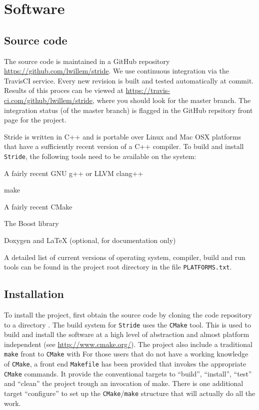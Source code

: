 \chapter{Software}
\label{chap:software}


\section{Source code}
\label{section:source}
The source code is maintained in a GitHub repository \url{https://github.com/lwillem/stride}. We use continuous integration via the TravisCI service. Every new revision is built and tested automatically at commit. Results of this proces can be viewed at \url{https://travis-ci.com/github/lwillem/stride}, where you should look for the master branch. The integration status (of the master branch) is flagged in the GitHub repsitory front page for the project. 

Stride is written in C++ and is portable over Linux and Mac OSX platforms that have a sufficiently recent version of a C++ compiler. To build and install \texttt{Stride}, the following tools need to be available on the system:
\begin{compactitem}
    \item A fairly recent GNU g++ or LLVM clang++
    \item make
    \item A fairly recent CMake
    \item The Boost library
    \item Doxygen  and LaTeX (optional, for documentation only)
\end{compactitem}
A detailed list of current versions of operating system, compiler, build and run tools can be found in the project root directory in the file \texttt{PLATFORMS.txt}.

\section{Installation}
\label{section:Installation}

To install the project, first obtain the source code by cloning the code repository to a directory .
The build system for \texttt{Stride} uses the \texttt{CMake} tool. This is used to build and install the software at a high level of abstraction and almost platform independent (see \url{http://www.cmake.org/}).
The project also include a traditional \texttt{make} front to \texttt{CMake}  with 
For those users that do not have a working knowledge of \texttt{CMake}, a front end \texttt{Makefile} has been provided that invokes the appropriate \texttt{CMake} commands. It provide the conventional targets to ``build'', ``install'', ``test'' and ``clean'' the project trough an invocation of make. There is one additional target ``configure'' to set up the \texttt{CMake}/\texttt{make} structure that will actually do all the work.

